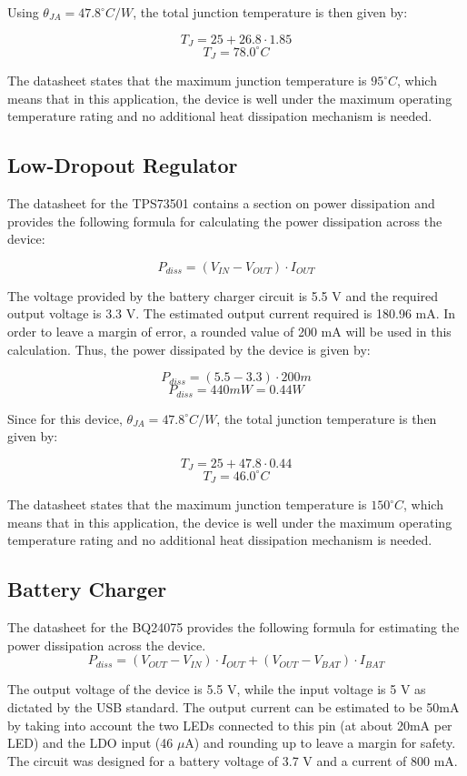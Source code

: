 \documentclass[12pt,letterpaper]{article}
\begin{document}
Using $\theta_{JA} = 47.8^\circ C/W$, the total junction temperature is then given by:

\[T_J = 25 + 26.8 \cdot 1.85 \]
\[\boxed{T_J = 78.0 ^\circ C}\]

The datasheet states that the maximum junction temperature is $95^\circ C$, which means that in this application, the device is well under the maximum operating temperature rating and no additional heat dissipation mechanism is needed.


\subsection{Low-Dropout Regulator}
The datasheet for the TPS73501 contains a section on power dissipation and provides the following formula for calculating the power dissipation across the device:

\[P_{diss} = \left(V_{IN} - V_{OUT}\right)\cdot I_{OUT}\]

The voltage provided by the battery charger circuit is 5.5 V and the required output voltage is 3.3 V.  The estimated output current required is 180.96 mA.  In order to leave a margin of error, a rounded value of 200 mA will be used in this calculation.  Thus, the power dissipated by the device is given by:

\[P_{diss} = \left(5.5 - 3.3\right)\cdot 200m\]
\[\boxed{P_{diss} = 440mW = 0.44W}\]

Since for this device, $\theta_{JA} = 47.8^\circ C/W$, the total junction temperature is then given by:

\[T_J = 25 + 47.8 \cdot 0.44 \]
\[\boxed{T_J = 46.0 ^\circ C}\]

The datasheet states that the maximum junction temperature is $150^\circ C$, which means that in this application, the device is well under the maximum operating temperature rating and no additional heat dissipation mechanism is needed.

\subsection{Battery Charger}

The datasheet for the BQ24075 provides the following formula for estimating the power dissipation across the device.
\[P_{diss} = \left(V_{OUT} - V_{IN}\right)\cdot I_{OUT} + \left(V_{OUT} - V_{BAT}\right)\cdot I_{BAT}\]

The output voltage of the device is 5.5 V, while the input voltage is 5 V as dictated by the USB standard.  The output current can be estimated to be 50mA by taking into account the two LEDs connected to this pin (at about 20mA per LED) and the LDO input (46 $\mu$A) and rounding up to leave a margin for safety.  The circuit was designed for a battery voltage of 3.7 V and a current of 800 mA.
\end{document}
